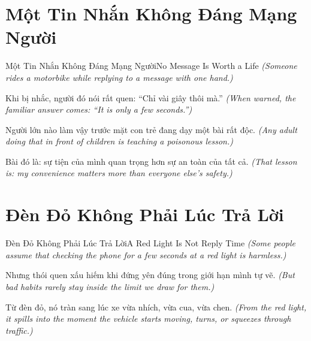 \section{Một Tin Nhắn Không Đáng Mạng Người}
\begin{truyen}{Một Tin Nhắn Không Đáng Mạng Người}{No Message Is Worth a Life}
\textit{(Someone rides a motorbike while replying to a message with one hand.)}

Khi bị nhắc, người đó nói rất quen: ``Chỉ vài giây thôi mà.''
\textit{(When warned, the familiar answer comes: ``It is only a few seconds.'')}


Người lớn nào làm vậy trước mặt con trẻ đang dạy một bài rất độc.
\textit{(Any adult doing that in front of children is teaching a poisonous lesson.)}

Bài đó là: sự tiện của mình quan trọng hơn sự an toàn của tất cả.
\textit{(That lesson is: my convenience matters more than everyone else's safety.)}
\end{truyen}

\section{Đèn Đỏ Không Phải Lúc Trả Lời}
\begin{truyen}{Đèn Đỏ Không Phải Lúc Trả Lời}{A Red Light Is Not Reply Time}
\textit{(Some people assume that checking the phone for a few seconds at a red light is harmless.)}

Nhưng thói quen xấu hiếm khi đứng yên đúng trong giới hạn mình tự vẽ.
\textit{(But bad habits rarely stay inside the limit we draw for them.)}

Từ đèn đỏ, nó tràn sang lúc xe vừa nhích, vừa cua, vừa chen.
\textit{(From the red light, it spills into the moment the vehicle starts moving, turns, or squeezes through traffic.)}

\end{truyen}

